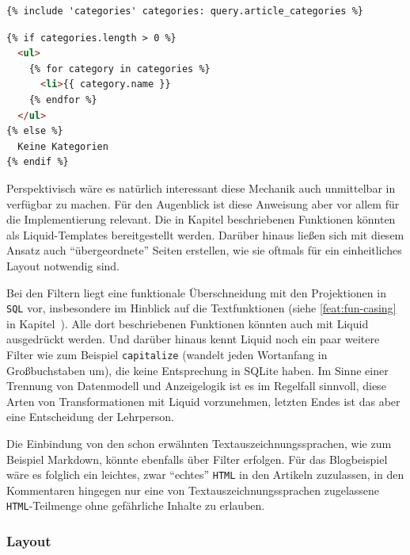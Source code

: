 \begin{lstlisting}[float=h, language=HTML, caption={Verwendung der Liquid-Anweisung \texttt{include}}, label={lst:liquid-include-caller}]
{% include 'categories' categories: query.article_categories %}
\end{lstlisting}

\begin{lstlisting}[float=h, language=HTML, caption={\texttt{categories.liquid}, Template für die Liquid-Anweisung \texttt{include}}, label={lst:liquid-include-template}]
{% if categories.length > 0 %}
  <ul>
    {% for category in categories %}
      <li>{{ category.name }}
    {% endfor %}
  </ul>
{% else %}
  Keine Kategorien
{% endif %}
\end{lstlisting}

Perspektivisch wäre es natürlich interessant diese Mechanik auch unmittelbar in \idename{} verfügbar zu machen. Für den Augenblick ist diese Anweisung aber vor allem für die Implementierung relevant. Die in Kapitel  beschriebenen Funktionen könnten als Liquid-Templates bereitgestellt werden. Darüber hinaus ließen sich mit diesem Ansatz auch "`übergeordnete"' Seiten erstellen, wie sie oftmals für ein einheitliches Layout notwendig sind.

Bei den Filtern liegt eine funktionale Überschneidung mit den Projektionen in \texttt{SQL} vor, insbesondere im Hinblick auf die Textfunktionen (siehe \ref{feat:fun-casing} in Kapitel~). Alle dort beschriebenen Funktionen könnten auch mit Liquid ausgedrückt werden. Und darüber hinaus kennt Liquid noch ein paar weitere Filter wie zum Beispiel \texttt{capitalize} (wandelt jeden Wortanfang in Großbuchstaben um), die keine Entsprechung in SQLite haben. Im Sinne einer Trennung von Datenmodell und Anzeigelogik ist es im Regelfall sinnvoll, diese Arten von Transformationen mit Liquid vorzunehmen, letzten Endes ist das aber eine Entscheidung der Lehrperson.

Die Einbindung von den schon erwähnten Textauszeichnungssprachen, wie zum Beispiel Markdown, könnte ebenfalls über Filter erfolgen. Für das Blogbeispiel wäre es folglich ein leichtes, zwar "`echtes"' \texttt{HTML} in den Artikeln zuzulassen, in den Kommentaren hingegen nur eine von Textauszeichnungssprachen zugelassene \texttt{HTML}-Teilmenge ohne gefährliche Inhalte zu erlauben.

\subsubsection{Layout}

